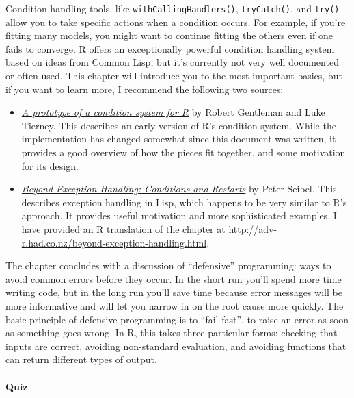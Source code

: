 Condition handling tools, like \texttt{withCallingHandlers()},
\texttt{tryCatch()}, and \texttt{try()} allow you to take specific
actions when a condition occurs. For example, if you're fitting many
models, you might want to continue fitting the others even if one fails
to converge. R offers an exceptionally powerful condition handling
system based on ideas from Common Lisp, but it's currently not very well
documented or often used. This chapter will introduce you to the most
important basics, but if you want to learn more, I recommend the
following two sources:

\begin{itemize}
\item
  \href{http://homepage.stat.uiowa.edu/~luke/R/exceptions/simpcond.html}{\emph{A
  prototype of a condition system for R}} by Robert Gentleman and Luke
  Tierney. This describes an early version of R's condition system.
  While the implementation has changed somewhat since this document was
  written, it provides a good overview of how the pieces fit together,
  and some motivation for its design.
\item
  \href{http://www.gigamonkeys.com/book/beyond-exception-handling-conditions-and-restarts.html}{\emph{Beyond
  Exception Handling: Conditions and Restarts}} by Peter Seibel. This
  describes exception handling in Lisp, which happens to be very similar
  to R's approach. It provides useful motivation and more sophisticated
  examples. I have provided an R translation of the chapter at
  \url{http://adv-r.had.co.nz/beyond-exception-handling.html}.
\end{itemize}

The chapter concludes with a discussion of ``defensive'' programming:
ways to avoid common errors before they occur. In the short run you'll
spend more time writing code, but in the long run you'll save time
because error messages will be more informative and will let you narrow
in on the root cause more quickly. The basic principle of defensive
programming is to ``fail fast'', to raise an error as soon as something
goes wrong. In R, this takes three particular forms: checking that
inputs are correct, avoiding non-standard evaluation, and avoiding
functions that can return different types of output.

\hypertarget{quiz}{%
\paragraph{Quiz}\label{quiz}}

